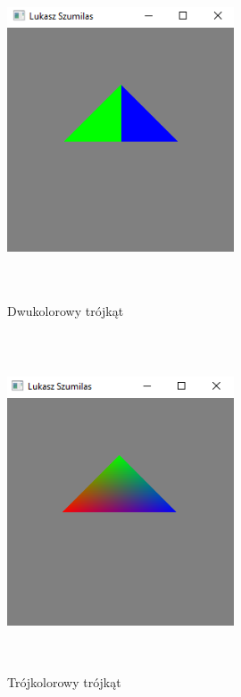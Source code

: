 \documentclass[polish,polish,a4paper]{article}
\begin{document}
            \begin{figure}[h!]
      \centering
      \includegraphics[width=0.6\textwidth,height=10cm]{trojkat.png}
      \caption{Dwukolorowy trójkąt}
      \label{fig:zrzut1}
    \end{figure}
    
      \begin{figure}[h!]
      \centering
      \includegraphics[width=0.6\textwidth,height=10cm]{trzykolory.png}
      \caption{Trójkolorowy trójkąt}
      \label{fig:zrzut1}
    \end{figure}
    
\end{document}
